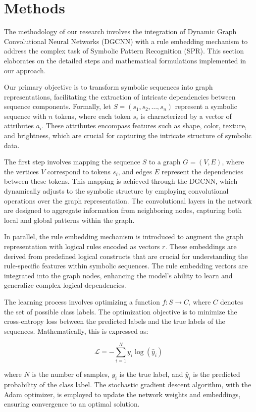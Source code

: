 \documentclass{article}
\begin{document}
\section{Methods}
The methodology of our research involves the integration of Dynamic Graph Convolutional Neural Networks (DGCNN) with a rule embedding mechanism to address the complex task of Symbolic Pattern Recognition (SPR). This section elaborates on the detailed steps and mathematical formulations implemented in our approach.

Our primary objective is to transform symbolic sequences into graph representations, facilitating the extraction of intricate dependencies between sequence components. Formally, let \( S = (s_1, s_2, \ldots, s_n) \) represent a symbolic sequence with \( n \) tokens, where each token \( s_i \) is characterized by a vector of attributes \( a_i \). These attributes encompass features such as shape, color, texture, and brightness, which are crucial for capturing the intricate structure of symbolic data.

The first step involves mapping the sequence \( S \) to a graph \( G = (V, E) \), where the vertices \( V \) correspond to tokens \( s_i \), and edges \( E \) represent the dependencies between these tokens. This mapping is achieved through the DGCNN, which dynamically adjusts to the symbolic structure by employing convolutional operations over the graph representation. The convolutional layers in the network are designed to aggregate information from neighboring nodes, capturing both local and global patterns within the graph.

In parallel, the rule embedding mechanism is introduced to augment the graph representation with logical rules encoded as vectors \( r \). These embeddings are derived from predefined logical constructs that are crucial for understanding the rule-specific features within symbolic sequences. The rule embedding vectors are integrated into the graph nodes, enhancing the model's ability to learn and generalize complex logical dependencies.

The learning process involves optimizing a function \( f: S \rightarrow C \), where \( C \) denotes the set of possible class labels. The optimization objective is to minimize the cross-entropy loss between the predicted labels and the true labels of the sequences. Mathematically, this is expressed as:

\[
\mathcal{L} = -\sum_{i=1}^{N} y_i \log(\hat{y}_i)
\]

where \( N \) is the number of samples, \( y_i \) is the true label, and \( \hat{y}_i \) is the predicted probability of the class label. The stochastic gradient descent algorithm, with the Adam optimizer, is employed to update the network weights and embeddings, ensuring convergence to an optimal solution.
\end{document}
